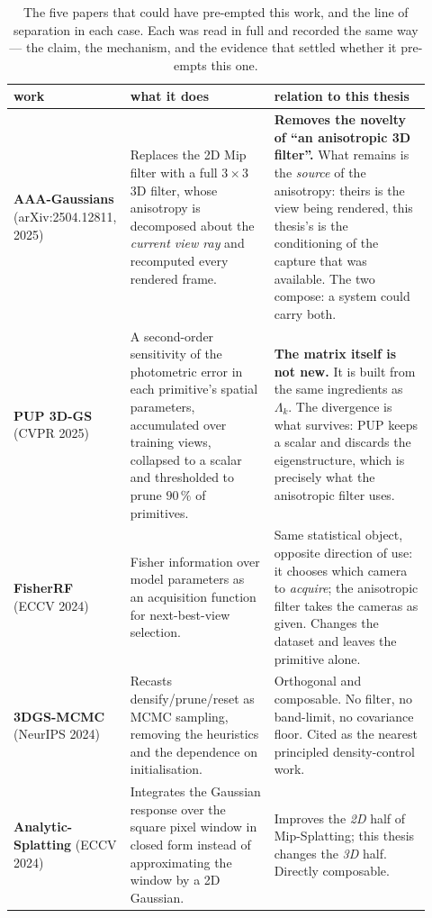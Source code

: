 \begin{table}[htbp]
  \centering
  \caption{The five papers that could have pre-empted this work, and the line of
  separation in each case. Each was read in full and recorded the same way ---
  the claim, the mechanism, and the evidence that settled whether it pre-empts
  this one.}
  \label{tab:related}
  \small
  \begin{tabular}{p{0.21\linewidth}p{0.34\linewidth}p{0.37\linewidth}}
    \toprule
    work & what it does & relation to this thesis \\
    \midrule
    \textbf{AAA-Gaussians} (arXiv:2504.12811, 2025)
      & Replaces the 2D Mip filter with a full $3\times3$ 3D filter, whose
        anisotropy is decomposed about the \emph{current view ray} and
        recomputed every rendered frame.
      & \textbf{Removes the novelty of ``an anisotropic 3D filter''.} What
        remains is the \emph{source} of the anisotropy: theirs is the view being
        rendered, this thesis's is the conditioning of the capture that was
        available. The two compose: a system could carry both. \\
    \addlinespace[2pt]
    \textbf{PUP 3D-GS} (CVPR 2025)
      & A second-order sensitivity of the photometric error in each primitive's
        spatial parameters, accumulated over training views, collapsed to a
        scalar and thresholded to prune $90\,\%$ of primitives.
      & \textbf{The matrix itself is not new.} It is built from the same
        ingredients as $\Lambda_k$. The divergence is what survives: PUP keeps a
        scalar and discards the eigenstructure, which is precisely what the anisotropic filter uses. \\
    \addlinespace[2pt]
    \textbf{FisherRF} (ECCV 2024)
      & Fisher information over model parameters as an acquisition function for
        next-best-view selection.
      & Same statistical object, opposite direction of use: it chooses which
        camera to \emph{acquire}; the anisotropic filter takes the cameras as given. Changes the dataset and leaves the primitive alone. \\
    \addlinespace[2pt]
    \textbf{3DGS-MCMC} (NeurIPS 2024)
      & Recasts densify/prune/reset as MCMC sampling, removing the heuristics and
        the dependence on initialisation.
      & Orthogonal and composable. No filter, no band-limit, no covariance floor.
        Cited as the nearest principled density-control work. \\
    \addlinespace[2pt]
    \textbf{Analytic-Splatting} (ECCV 2024)
      & Integrates the Gaussian response over the square pixel window in closed
        form instead of approximating the window by a 2D Gaussian.
      & Improves the \emph{2D} half of Mip-Splatting; this thesis changes the
        \emph{3D} half. Directly composable. \\
    \bottomrule
  \end{tabular}
\end{table}

